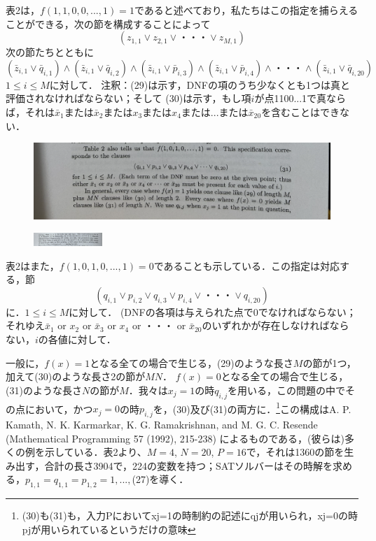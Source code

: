 \documentclass[dvipdfmx,a4paper,12pt]{jsarticle}
\begin{document}
 表2は，$f(1,1,0,0,...,1)=1$であると述べており，私たちはこの指定を捕らえることができる，次の節を構成することによって
 \begin{equation}
(z_{1,1} \lor z_{2,1} \lor ・・・ \lor z_{M,1})
\end{equation}  
次の節たちとともに
  \begin{equation}
(\bar{z}_{i,1} \lor \bar{q}_{i,1}) \land (\bar{z}_{i,1} \lor \bar{q}_{i,2}) \land (\bar{z}_{i,1} \lor \bar{p}_{i,3}) \land (\bar{z}_{i,1} \lor \bar{p}_{i,4}) \land ・・・ \land (\bar{z}_{i,1} \lor \bar{q}_{i,20})
\end{equation}  
$1 \le i \le M$に対して．
注釈：(29)は示す，DNFの項のうち少なくとも1つは真と評価されなければならない；そして
(30)は示す，もし項$i$が点1100...1で真ならば，それは$\bar{x}_{1}$または$\bar{x}_{2}$または$x_{3}$または$x_{4}または...$または$\bar{x}_{20}$を含むことはできない．

\clearpage
\begin{figure}[htbp]
  \centering
  \includegraphics[width=130mm]{images/2-4.png}
\end{figure}
\begin{figure}[htbp]
  \centering
  \includegraphics[width=26mm,angle=270]{images/3-1.jpg}
\end{figure}

表2はまた，$f(1,0,1,0,...,1)=0$であることも示している．この指定は対応する，節
  \begin{equation}
(q_{i,1} \lor p_{i,2} \lor q_{i,3} \lor p_{i,4} \lor ・・・ \lor q_{i,20})
\end{equation}  
に．$1 \le i \le M$に対して．
(DNFの各項は与えられた点で0でなければならない；それゆえ$\bar{x}_{1}$ or $x_{2}$ or $\bar{x}_{3}$ or $x_{4}$ or ・・・ or $\bar{x}_{20}$のいずれかが存在しなければならない，$i$の各値に対して．

一般に，$f(x) = 1$となる全ての場合で生じる，(29)のような長さ$M$の節が1つ，加えて(30)のような長さ2の節が$MN$．
$f(x) = 0$となる全ての場合で生じる，(31)のような長さ$N$の節が$M$．我々は$x_{j}=1$の時$q_{i,j}$を用いる，この問題の中でその点において，かつ$x_{j}=0$の時$p_{i,j}$を，(30)及び(31)の両方に．\footnote{(30)も(31)も，入力Pにおいてxj=1の時制約の記述にqjが用いられ，xj=0の時pjが用いられているというだけの意味}この構成はA. P. Kamath, N. K. Karmarkar, K. G. Ramakrishnan, and M. G. C. Resende (Mathematical Programming 57 (1992), 215-238) によるものである，(彼らは)多くの例を示している．表2より、$M = 4$, $N = 20$, $P = 16$で，それは1360の節を生み出す，合計の長さ3904で，224の変数を持つ；SATソルバーはその時解を求める，$p_{1,1}=q_{1,1}=p_{1,2}=1,...,$(27)を導く．
\end{document}
